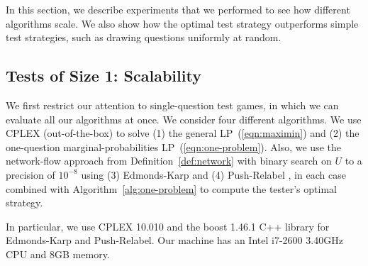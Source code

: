 \documentclass{article}
\begin{document}
In this section, we describe experiments that we performed to see how
different algorithms scale. We also show how the optimal test strategy
outperforms simple test strategies, such as drawing questions uniformly at
random.

\subsection{Tests of Size 1: Scalability}

We first restrict our attention to single-question test games, in which we
can evaluate all our algorithms at once.
We consider four different algorithms.  We use CPLEX (out-of-the-box)
to solve (1) the general LP~(\ref{eqn:maximin}) and (2) the one-question
marginal-probabilities LP~(\ref{eqn:one-problem}).  Also, we use the
network-flow approach from Definition~\ref{def:network} with binary search
on $U$ to a precision of $10^{-8}$ using (3) Edmonds-Karp \cite{Edmonds:1972} and (4)
Push-Relabel \cite{Goldberg:1988:NAM:48014.61051}, in each case combined with 
Algorithm~\ref{alg:one-problem} to compute the tester's optimal strategy.

In particular, we use CPLEX 10.010 and the boost 1.46.1 C++ library
for Edmonds-Karp and Push-Relabel.
Our machine has an
Intel i7-2600 3.40GHz CPU and 8GB memory.

\end{document}
